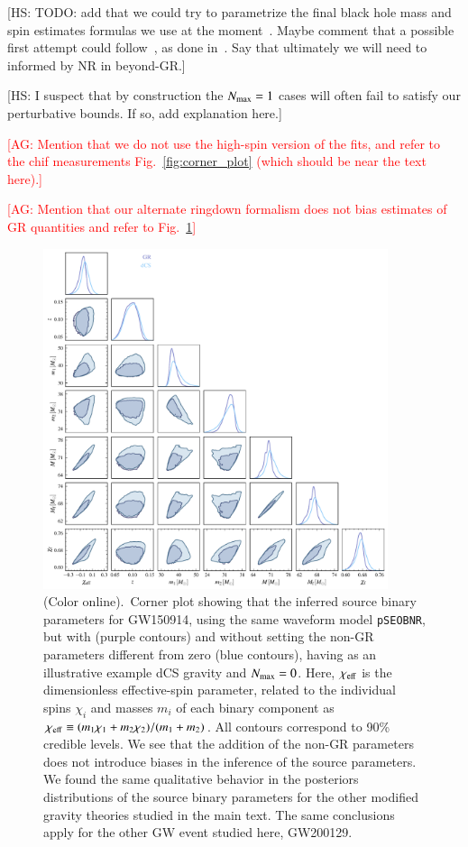 \documentclass[twocolumn,
               prd,
               aps,
               superscriptaddress,
               tightenlines,
               nofootinbib,
               eqsecnum,
               amsfonts,
               amsmath,
               longbibliography]{revtex4-1}
\newcommand{\pSEOB}{\texttt{pSEOBNR}}
\newcommand{\agcomm}[1]{{\textcolor{red}{{[AG: #1]}}}}
\newcommand{\hs}[1]{{\textcolor{TealBlue}{{#1}}}}
\newcommand{\hscomm}[1]{{\textcolor{TealBlue}{{[HS: #1]}}}}
\begin{document}
\hscomm{TODO: add that we could try to parametrize the final black hole mass and spin estimates formulas we
use at the moment~\cite{Hofmann:2016yih}. Maybe comment that a possible first attempt could follow~\cite{Buonanno:2007sv},
as done in~\cite{Jai-akson:2017ldo,Li:2020wse}. Say that ultimately we will need to informed by NR in beyond-GR.}

\hscomm{I suspect that by construction the $N_{\rm max} = 1$ cases will often fail to satisfy our
perturbative bounds. If so, add explanation here.}

\agcomm{Mention that we do not use the high-spin version of the fits, and refer to the
chif measurements Fig.~\ref{fig:corner_plot} (which should be near the text here).}

\agcomm{Mention that our alternate ringdown formalism does not bias estimates of GR quantities
and refer to Fig.~\ref{fig:corner_plot_all}}

\begin{figure}[t]
\includegraphics[width=0.9\textwidth]{figs/tmp_GW150914_intrinsic_params.pdf}
\caption{(Color online).~Corner plot showing that the inferred source binary parameters for GW150914,
using the same waveform model \pSEOB, but with (purple contours) and without setting the non-GR parameters different
from zero (blue contours), having as an illustrative example dCS gravity and $N_{\rm max}=0$.
%
\hs{Here, $\chi_{\rm eff}$ is the dimensionless effective-spin parameter, related to the individual spins $\chi_{i}$
and masses $m_{i}$ of each binary component as $\chi_{\rm eff} \equiv (m_1 \chi_1 + m_2 \chi_2) / (m_1 + m_2)$.}
%
All contours correspond to 90\% credible levels.
%
We see that the addition of the non-GR parameters does not introduce biases in the
inference of the source parameters.
%
We found the same qualitative behavior in the posteriors distributions of the
source binary parameters for the other modified gravity theories studied in the
main text.
%
The same conclusions apply for the other GW event studied here, GW200129.
}
\label{fig:corner_plot_all}
\end{figure}
\end{document}
